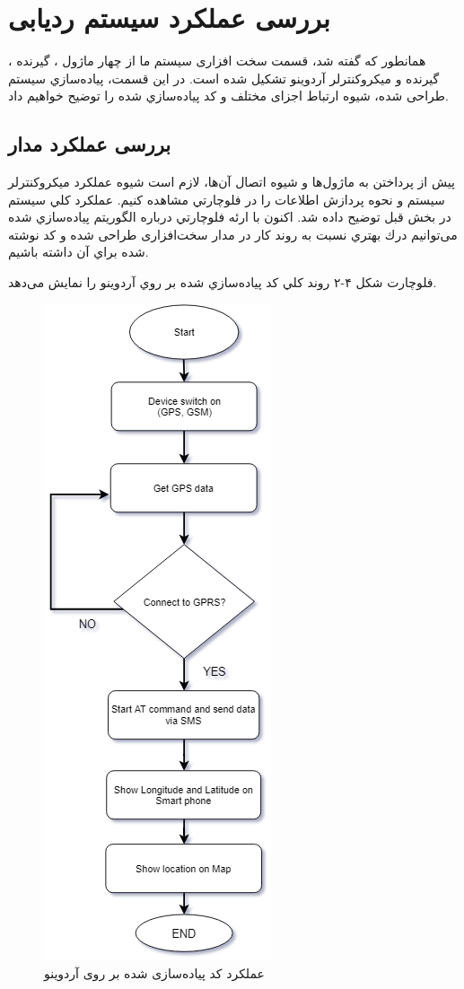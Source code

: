 \section{بررسی عملکرد سیستم ردیابی}
همانطور كه گفته شد، قسمت سخت‌ افزاری سیستم ما از چهار ماژول ، گیرنده ، گیرنده  و میکروکنترلر آردوینو تشکیل شده است. در اين قسمت، پياده‌سازي سيستم طراحی شده، شيوه ارتباط اجزای مختلف و كد پياده‌سازي شده را توضيح خواهیم داد.
\subsection{بررسی عملکرد مدار}
پيش از پرداختن به ماژول‌ها و شيوه اتصال آن‌ها، لازم است شيوه عملكرد ميكروكنترلر سيستم و نحوه پردازش اطلاعات را در فلوچارتي مشاهده كنيم. عملكرد كلي سيستم در بخش قبل توضيح داده شد. اكنون با ارئه فلوچارتي درباره الگوريتم پياده‌سازي شده می‌توانیم درك بهتري نسبت به روند كار در مدار سخت‌افزاری طراحی شده و كد نوشته شده براي آن داشته باشيم.

\newpage
فلوچارت شكل ۴-۲ روند كلي كد پياده‌سازي شده بر روي آردوینو را نمايش می‌دهد.
\begin{figure}[h!]
	\centering
	\includegraphics[width=.4\textwidth]{tracking-flowchart}
	\caption{عملکرد کد پیاده‌سازی شده بر روی آردوینو \cite{Rahman2016,Alshamsi,Hazza}}
\end{figure}



